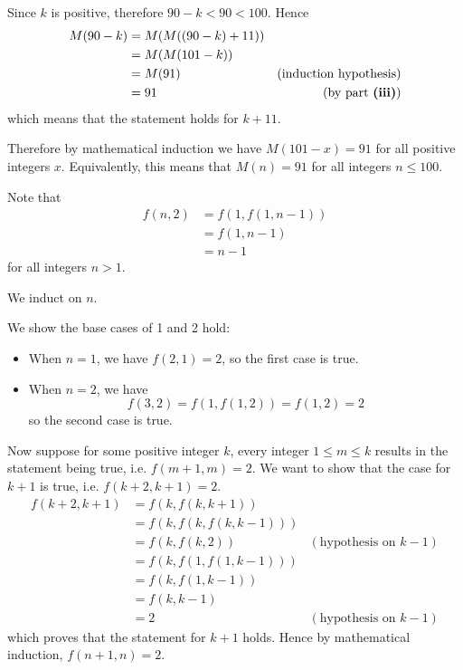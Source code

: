 \begin{questions}
\begin{partquestions}{\roman*}
        Since $k$ is positive, therefore $90 - k < 90 < 100$. Hence
        \begin{align*}
            M(90 - k) &= M(M((90 - k) + 11))\\
            &= M(M(101 - k))\\
            &= M(91) & (\text{induction hypothesis})\\
            &= 91 & (\text{by part \textbf{(iii)}})
        \end{align*}
        which means that the statement holds for $k + 11$.

        Therefore by mathematical induction we have $M(101 - x) = 91$ for all positive integers $x$. Equivalently, this means that $M(n) = 91$ for all integers $n \leq 100$.
    \end{partquestions}

    \item \begin{partquestions}{\roman*}
        \item Note that
        \begin{align*}
            f(n,2) &= f(1, f(1, n-1))\\
            &= f(1, n-1)\\
            &= n-1
        \end{align*}
        for all integers $n > 1$.
        
        \item We induct on $n$.
        
        We show the base cases of 1 and 2 hold:
        \begin{itemize}
            \item When $n = 1$, we have $f(2, 1) = 2$, so the first case is true.
            \item When $n = 2$, we have
            \[
                f(3,2) = f(1, f(1, 2)) = f(1, 2) = 2
            \]
            so the second case is true.
        \end{itemize}
    
        Now suppose for some positive integer $k$, every integer $1 \leq m \leq k$ results in the statement being true, i.e. $f(m+1,m) = 2$. We want to show that the case for $k+1$ is true, i.e. $f(k+2, k+1) = 2$.
        \begin{align*}
            f(k+2, k+1) &= f(k, f(k, k+1))\\
            &= f(k, f(k, f(k, k-1)))\\
            &= f(k, f(k, 2)) & (\text{hypothesis on } k-1)\\
            &= f(k, f(1, f(1, k-1)))\\
            &= f(k, f(1, k-1))\\
            &= f(k, k-1) \\
            &= 2 & (\text{hypothesis on } k-1)
        \end{align*}
        which proves that the statement for $k+1$ holds. Hence by mathematical induction, $f(n+1, n) = 2$.
        

\end{partquestions}
\end{questions}
